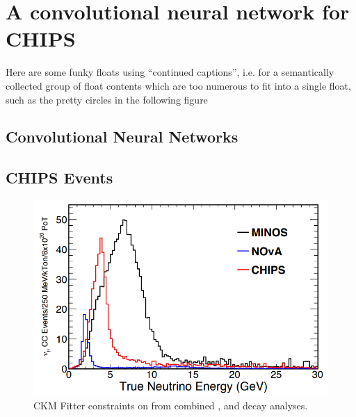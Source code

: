 \chapter{A convolutional neural network for CHIPS}
\label{chap:cvn}

Here are some funky floats using ``continued captions'', i.e. for a semantically
collected group of float contents which are too numerous to fit into a single
float, such as the pretty circles in the following figure

\section{Convolutional Neural Networks}
\label{sec:cnn}

\section{CHIPS Events}
\label{sec:events}

\begin{figure}
    \includegraphics[width=\largefigwidth]{diagrams/numi_axis}
    \caption[CKM Fitter constraints on \alphaCKM.]%
    {CKM Fitter constraints on \alphaCKM from combined \BToPiPi,
        \BToRhoPi and \BToRhoRho decay analyses.}
    \label{fig:numi_axis}
\end{figure}

